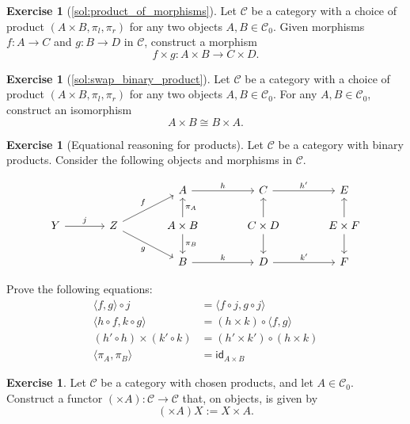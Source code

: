 \documentclass[a4paper,11pt, oneside,titlepage=false]{scrbook}
\theoremstyle{plain}
\theoremstyle{definition}
\newtheorem{exer}[thm]{Exercise}
\newcommand{\cfont}[1]{\ensuremath{\mathsf{#1}}}
\newcommand{\Cat}[1]{\mathcal{#1}}
\newcommand{\CC}{\Cat{C}}
\newcommand{\Ob}[1]{{#1}_0}
\newcommand{\Id}[1][]{\cfont{id}_{#1}}
\newcommand{\projl}{\ensuremath{\pi_l}}
\newcommand{\projr}{\ensuremath{\pi_r}}
\newcommand{\intoproduct}[2]{\ensuremath{\langle #1, #2 \rangle}}
\newcommand{\productmap}[2]{\ensuremath{ #1 \times #2 }}
\newcommand{\co}[2]{\ensuremath{#2 \circ #1}}
\begin{document}
\begin{exer}[\cref{sol:product_of_morphisms}]\label{exer:product_of_morphisms}
  Let $\CC$ be a category with a choice of product $(A\times B, \projl, \projr)$ for any two objects $A,B\in \Ob{\CC}$.
  Given morphisms $f : A \to C$ and $g : B \to D$ in $\CC$, construct a morphism
  \[ f \times g : A \times B \to C \times D.\]
\end{exer}


\begin{exer}[\cref{sol:swap_binary_product}]\label{exer:swap_binary_product}
  Let $\CC$ be a category with a choice of product $(A\times B, \projl, \projr)$ for any two objects $A,B\in \Ob{\CC}$.
  For any $A, B \in \Ob\CC$, construct an isomorphism
  \[ A \times B \cong B \times A. \]
\end{exer}

\begin{exer}[Equational reasoning for products]
  Let $\CC$ be a category with binary products.
  Consider the following objects and morphisms in $\CC$.

  \[
    \begin{tikzcd}[column sep=large]
      &
      &
      A \ar[r, "h"]
      &
      C \ar[r, "h'"]
      &
      E
      \\
      Y \ar[r, "j"]
      &
      Z \ar[ru, "f"] \ar[rd, "g"'] %
      &
      A\times B \ar[u, "\pi_A"'] \ar[d, "\pi_B"]
      &
      C \times D  \ar[u] \ar[d]
      &
      E \times F  \ar[u] \ar[d]
      \\
      &
      &
      B \ar[r,"k"]
      &
      D \ar[r,"k'"]
      &
      F
    \end{tikzcd}
  \]

  Prove the following equations:
  \begin{align}
    \co{j}{\intoproduct{f}{g}} &= \intoproduct{\co j f}{\co j g}
    \\
    \intoproduct{\co f h}{\co g k} &= \co {\intoproduct f g} {(\productmap h k)}
    \\
    \productmap{(\co h {h'})}{(\co k {k'})} &= \co {(\productmap h k)}{(\productmap {h'} {k'})}
    \\
    \intoproduct{\pi_A}{\pi_B} &= \Id[A \times B]
  \end{align}
\end{exer}

\begin{exer}
  Let $\CC$ be a category with chosen products, and let $A \in \Ob\CC$.
  Construct a functor $(\times A) : \CC \to \CC$ that, on objects, is given by
  \[ (\times A) X := X \times A. \]
\end{exer}
\end{document}
